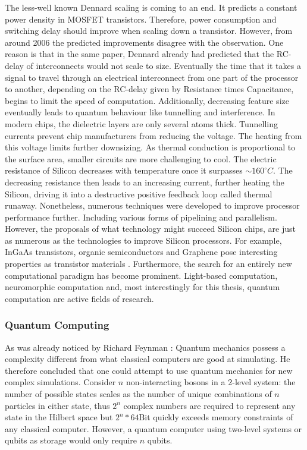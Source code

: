 \documentclass[Master]{subfiles}
\begin{document}
The less-well known Dennard scaling \cite{Dennard1974} is coming to an end. It predicts a constant power density in MOSFET transistors. Therefore, power consumption and switching delay should improve when scaling down a transistor.
However, from around 2006 the predicted improvements disagree with the observation\cite{Bohr2007}.
One reason is that in the same paper, Dennard already had predicted that the RC-delay of interconnects would not scale to size.
Eventually the time that it takes a signal to travel through an electrical interconnect from one part of the processor to another, depending on the RC-delay given by Resistance times Capacitance, begins to limit the speed of computation. Additionally, decreasing feature size eventually leads to quantum behaviour like tunnelling and interference. In modern chips, the dielectric layers are only several atoms thick. Tunnelling currents prevent chip manufacturers from reducing the voltage. The heating from this voltage limits further downsizing. As thermal conduction is proportional to the surface area, smaller circuits are more challenging to cool. The electric resistance of Silicon decreases with temperature once it surpasses $\sim 160^{\circ}C$. The decreasing resistance then leads to an increasing current, further heating the Silicon, driving it into a destructive positive feedback loop called thermal runaway. 
Nonetheless, numerous techniques were developed to improve processor performance further. Including various forms of pipelining and parallelism. However, the proposals of what technology might succeed Silicon chips, are just as numerous as the technologies to improve Silicon processors.
For example, InGaAs transistors, organic semiconductors and Graphene pose interesting properties as transistor materials \cite{luisier2011ultimate}.
Furthermore, the search for an entirely new computational paradigm has become prominent.
Light-based computation, neuromorphic computation and, most interestingly for this thesis, quantum computation are active fields of research.

\subsubsection{Quantum Computing}
As was already noticed by Richard Feynman \cite{Feynmana}: Quantum mechanics possess a complexity different from what classical computers are good at simulating. He therefore concluded that one could attempt to use quantum mechanics for new complex simulations. Consider $n$ non-interacting bosons in a 2-level system: the number of possible states scales as the number of unique combinations of $n$ particles in either state, thus $2^n$ complex numbers are required to represent any state in the Hilbert space but $2^n * 64$Bit quickly exceeds memory constraints of any classical computer. However, a quantum computer using two-level systems or qubits as storage would only require $n$ qubits. 
\end{document}
